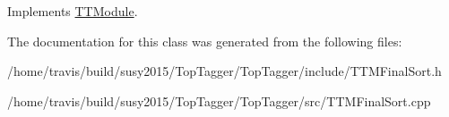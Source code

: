 Implements \hyperlink{classTTModule_a14e7c03fbf4ee1a5008c9344adc7c896}{T\-T\-Module}.



The documentation for this class was generated from the following files\-:\begin{DoxyCompactItemize}
\item 
/home/travis/build/susy2015/\-Top\-Tagger/\-Top\-Tagger/include/T\-T\-M\-Final\-Sort.\-h\item 
/home/travis/build/susy2015/\-Top\-Tagger/\-Top\-Tagger/src/T\-T\-M\-Final\-Sort.\-cpp\end{DoxyCompactItemize}

